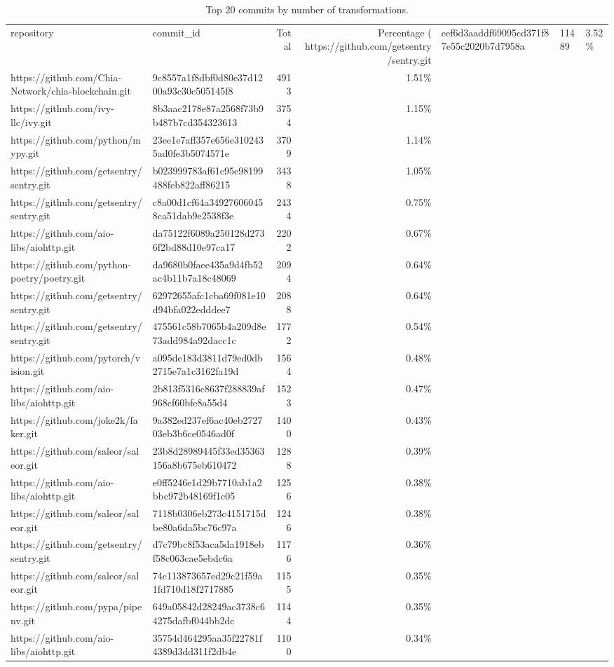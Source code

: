 \begin{table}
\caption{Top 20 commits by number of transformations.}
\label{tab:top-commits}
\begin{tabular}{llrr}
\toprule
repository & commit_id & Total & Percentage (%
\midrule
https://github.com/getsentry/sentry.git & eef6d3aaddf69095cd371f87e55c2020b7d7958a & \num{11489} & 3.52\% \\
https://github.com/Chia-Network/chia-blockchain.git & 9c8557a1f8dbf0d80e37d1200a93c30c505145f8 & \num{4913} & 1.51\% \\
https://github.com/ivy-llc/ivy.git & 8b3aac2178e87a2568f73b9b487b7cd354323613 & \num{3754} & 1.15\% \\
https://github.com/python/mypy.git & 23ee1e7aff357e656e3102435ad0fe3b5074571e & \num{3709} & 1.14\% \\
https://github.com/getsentry/sentry.git & b023999783af61c95e98199488feb822aff86215 & \num{3438} & 1.05\% \\
https://github.com/getsentry/sentry.git & c8a00d1cf64a349276060458ca51dab9e2538f3e & \num{2434} & 0.75\% \\
https://github.com/aio-libs/aiohttp.git & da75122f6089a250128d2736f2bd88d10e97ca17 & \num{2202} & 0.67\% \\
https://github.com/python-poetry/poetry.git & da9680b0faee435a9d4fb52ac4b11b7a18c48069 & \num{2094} & 0.64\% \\
https://github.com/getsentry/sentry.git & 62972655afc1cba69f081e10d94bfa022edddee7 & \num{2088} & 0.64\% \\
https://github.com/getsentry/sentry.git & 475561c58b7065b4a209d8e73add984a92dacc1c & \num{1772} & 0.54\% \\
https://github.com/pytorch/vision.git & a095de183d3811d79ed0db2715e7a1c3162fa19d & \num{1564} & 0.48\% \\
https://github.com/aio-libs/aiohttp.git & 2b813f5316c8637f288839af968cf60bfe8a55d4 & \num{1523} & 0.47\% \\
https://github.com/joke2k/faker.git & 9a382ed237ef6ac40eb272703eb3b6ce0546ad0f & \num{1400} & 0.43\% \\
https://github.com/saleor/saleor.git & 23b8d28989445f33ed35363156a8b675eb610472 & \num{1288} & 0.39\% \\
https://github.com/aio-libs/aiohttp.git & e0ff5246e1d29b7710ab1a2bbc972b48169f1c05 & \num{1256} & 0.38\% \\
https://github.com/saleor/saleor.git & 7118b0306eb273c4151715dbe80a6da5bc76c97a & \num{1246} & 0.38\% \\
https://github.com/getsentry/sentry.git & d7c79bc8f53aca5da1918ebf58c063cae5ebdc6a & \num{1176} & 0.36\% \\
https://github.com/saleor/saleor.git & 74c113873657ed29c21f59a1fd710d18f2717885 & \num{1155} & 0.35\% \\
https://github.com/pypa/pipenv.git & 649a05842d28249ac3738c64275dafbf044bb2dc & \num{1144} & 0.35\% \\
https://github.com/aio-libs/aiohttp.git & 35754d464295aa35f22781f4389d3dd311f2db4e & \num{1100} & 0.34\% \\
\bottomrule
\end{tabular}
\end{table}

